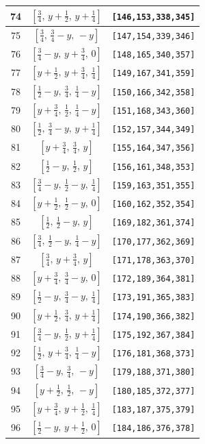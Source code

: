 \documentclass[fleqn,8pt]{jsarticle}
\begin{document}
\begin{longtable}{ccc}
74 & $\left[ \frac{3}{4},\, y + \frac{1}{2},\, y + \frac{1}{4} \right]$ & {\tt [146,153,338,345]} \\ \hline
75 & $\left[ \frac{3}{4},\, \frac{3}{4} - y,\, - y \right]$ & {\tt [147,154,339,346]} \\ \hline
76 & $\left[ \frac{3}{4} - y,\, y + \frac{3}{4},\, 0 \right]$ & {\tt [148,165,340,357]} \\ \hline
77 & $\left[ y + \frac{1}{2},\, y + \frac{3}{4},\, \frac{1}{4} \right]$ & {\tt [149,167,341,359]} \\ \hline
78 & $\left[ \frac{1}{2} - y,\, \frac{3}{4},\, \frac{1}{4} - y \right]$ & {\tt [150,166,342,358]} \\ \hline
79 & $\left[ y + \frac{3}{4},\, \frac{1}{2},\, \frac{1}{4} - y \right]$ & {\tt [151,168,343,360]} \\ \hline
80 & $\left[ \frac{1}{2},\, \frac{3}{4} - y,\, y + \frac{1}{4} \right]$ & {\tt [152,157,344,349]} \\ \hline
81 & $\left[ y + \frac{3}{4},\, \frac{3}{4},\, y \right]$ & {\tt [155,164,347,356]} \\ \hline
82 & $\left[ \frac{1}{2} - y,\, \frac{1}{2},\, y \right]$ & {\tt [156,161,348,353]} \\ \hline
83 & $\left[ \frac{3}{4} - y,\, \frac{1}{2} - y,\, \frac{1}{4} \right]$ & {\tt [159,163,351,355]} \\ \hline
84 & $\left[ y + \frac{1}{2},\, \frac{1}{2} - y,\, 0 \right]$ & {\tt [160,162,352,354]} \\ \hline
85 & $\left[ \frac{1}{2},\, \frac{1}{2} - y,\, y \right]$ & {\tt [169,182,361,374]} \\ \hline
86 & $\left[ \frac{3}{4},\, \frac{1}{2} - y,\, \frac{1}{4} - y \right]$ & {\tt [170,177,362,369]} \\ \hline
87 & $\left[ \frac{3}{4},\, y + \frac{3}{4},\, y \right]$ & {\tt [171,178,363,370]} \\ \hline
88 & $\left[ y + \frac{3}{4},\, \frac{3}{4} - y,\, 0 \right]$ & {\tt [172,189,364,381]} \\ \hline
89 & $\left[ \frac{1}{2} - y,\, \frac{3}{4} - y,\, \frac{1}{4} \right]$ & {\tt [173,191,365,383]} \\ \hline
90 & $\left[ y + \frac{1}{2},\, \frac{3}{4},\, y + \frac{1}{4} \right]$ & {\tt [174,190,366,382]} \\ \hline
91 & $\left[ \frac{3}{4} - y,\, \frac{1}{2},\, y + \frac{1}{4} \right]$ & {\tt [175,192,367,384]} \\ \hline
92 & $\left[ \frac{1}{2},\, y + \frac{3}{4},\, \frac{1}{4} - y \right]$ & {\tt [176,181,368,373]} \\ \hline
93 & $\left[ \frac{3}{4} - y,\, \frac{3}{4},\, - y \right]$ & {\tt [179,188,371,380]} \\ \hline
94 & $\left[ y + \frac{1}{2},\, \frac{1}{2},\, - y \right]$ & {\tt [180,185,372,377]} \\ \hline
95 & $\left[ y + \frac{3}{4},\, y + \frac{1}{2},\, \frac{1}{4} \right]$ & {\tt [183,187,375,379]} \\ \hline
96 & $\left[ \frac{1}{2} - y,\, y + \frac{1}{2},\, 0 \right]$ & {\tt [184,186,376,378]} \\
\end{longtable}
\end{document}
